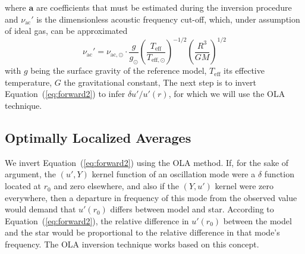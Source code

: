 where $\mathbf a$ are coefficients that must be estimated during the inversion procedure and $\nu_{\text{ac}}'$ is the dimensionless acoustic frequency cut-off, which, under assumption of ideal gas, can be approximated  %
\begin{equation}
    \nu_{\text{ac}}' 
    = 
    \nu_{\text{ac},\odot} \cdot
    \frac{g}{g_{\odot}} 
    \left( 
        \frac{T_{\text{eff}}}{T_{\text{eff},\odot}} 
    \right)^{-1/2} 
    \left( 
        \frac{R^3}{G M} 
    \right)^{1/2}
\end{equation}
with $g$ being the surface gravity of the reference model, $T_{\text{eff}}$ its effective temperature, $G$ the gravitational constant,  
The next step is to invert Equation~(\ref{eq:forward2}) to infer ${\delta u'/u'(r)}$, for which we will use the OLA technique. 

{}
\subsection{Optimally Localized Averages}
We invert Equation~(\ref{eq:forward2}) using the OLA method.
If, for the sake of argument, the ${(u',Y)}$ kernel function of an oscillation mode were a $\delta$ function located at $r_0$ and zero elsewhere, and also if the ${(Y,u')}$ kernel were zero everywhere, then a departure in frequency of this mode from the observed value would demand that ${u'(r_0)}$ differs between model and star. 
According to Equation~(\ref{eq:forward2}), the relative difference in ${u'(r_0)}$ between the model and the star would be proportional to the relative difference in that mode's frequency. The OLA inversion technique works based on this concept. 

